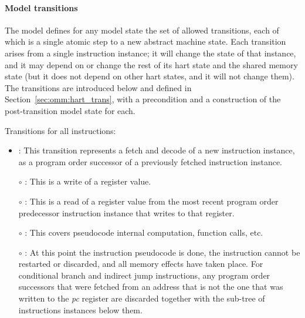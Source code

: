 \paragraph{Model transitions}
The model defines for any model state the set of allowed transitions, each of which is a single atomic step to a new abstract machine state.
Each transition arises from a single instruction instance; it will change the state of that instance, and it may depend on or change the rest of its hart state and the shared memory state (but it does not depend on other hart states, and it will not change them).
The transitions are introduced below and defined in Section~\ref{sec:omm:hart_trans}, with a precondition and a construction of the post-transition model state for each.

\noindent Transitions for all instructions:
\begin{itemize}
\item {}: This transition represents a fetch and decode of a new instruction instance, as a program order successor of a previously fetched instruction instance.
\item[$\circ$] : This is a write of a register value.
\item[$\circ$] : This is a read of a register value from the most recent program order predecessor instruction instance that writes to that register.
\item[$\circ$] : This covers pseudocode internal computation, function calls, etc.
\item[$\circ$] : At this point the instruction pseudocode is done, the instruction cannot be restarted or discarded, and all memory effects have taken place.
For conditional branch and indirect jump instructions, any program order successors that were fetched from an address that is not the one that was written to the {\em pc} register are discarded together with the sub-tree of instructions instances below them.
\end{itemize}

